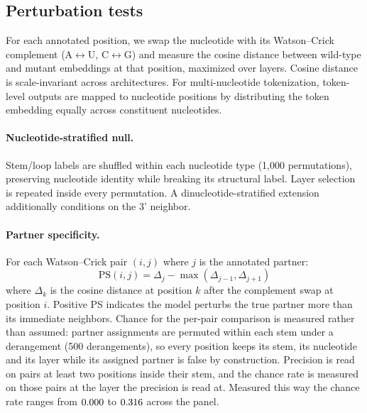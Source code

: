 \documentclass[11pt]{article}
\begin{document}
\subsection{Perturbation tests}
\label{sec:perturbation}

For each annotated position, we swap the nucleotide with its Watson--Crick
complement (A$\leftrightarrow$U, C$\leftrightarrow$G) and measure the cosine
distance between wild-type and mutant embeddings at that position, maximized
over layers. Cosine distance is scale-invariant across architectures.
For multi-nucleotide tokenization, token-level outputs are mapped to
nucleotide positions by distributing the token embedding equally across
constituent nucleotides.

\paragraph{Nucleotide-stratified null.}
Stem/loop labels are shuffled within each nucleotide type (1{,}000
permutations), preserving nucleotide identity while breaking its structural
label. Layer selection is repeated inside every permutation. A
dinucleotide-stratified extension additionally conditions on the 3' neighbor.

\paragraph{Partner specificity.}
\label{sec:ps-method}
For each Watson--Crick pair $(i, j)$ where $j$ is the annotated partner:
\[
\text{PS}(i,j) = \Delta_j - \max(\Delta_{j-1}, \Delta_{j+1})
\]
where $\Delta_k$ is the cosine distance at position $k$ after the complement
swap at position $i$. Positive PS indicates the model perturbs the true
partner more than its immediate neighbors. Chance for the per-pair comparison
is measured rather than assumed: partner assignments are permuted within each
stem under a derangement (500 derangements), so every position keeps its stem,
its nucleotide and its layer while its assigned partner is false by
construction. Precision is read on pairs at least two positions inside their
stem, and the chance rate is measured on those pairs at the layer the precision
is read at. Measured this way the chance rate ranges from
$0.000{}$ to $0.316{}$ across the panel.
\end{document}
